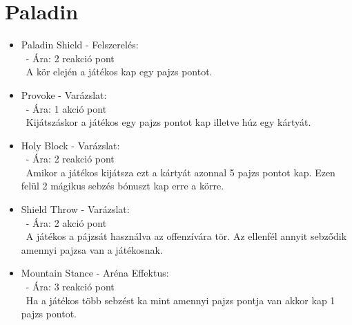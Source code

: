 \section{Paladin}
\begin{itemize}
    \item Paladin Shield - Felszerelés:\\\
    - Ára: 2 reakció pont \\\
    A kör elején a játékos kap egy pajzs pontot.
    \item Provoke - Varázslat:\\\
    - Ára: 1 akció pont \\\
    Kijátszáskor a játékos egy pajzs pontot kap illetve húz egy kártyát.
    \item Holy Block - Varázslat:\\\
    - Ára: 2 reakció pont \\\
    Amikor a játékos kijátsza ezt a kártyát azonnal 5 pajzs pontot kap. Ezen felül 2 mágikus sebzés bónuszt kap erre a körre.
    \item Shield Throw - Varázslat:\\\
    - Ára: 2 akció pont \\\
    A játékos a pájzsát használva az offenzívára tör. Az ellenfél annyit sebződik amennyi pajzsa van a játékosnak.
    \item Mountain Stance - Aréna Effektus:\\\
    - Ára: 3 reakció pont \\\
    Ha a játékos több sebzést ka mint amennyi pajzs pontja van akkor kap 1 pajzs pontot.
\end{itemize}

